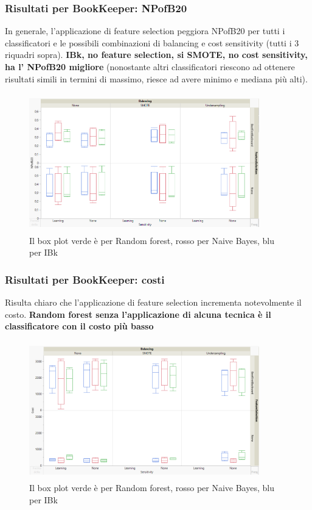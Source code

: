 \documentclass{beamer}
\begin{document}
\begin{frame}
	\frametitle{Risultati per BookKeeper: NPofB20}
	
	\fontsize{7pt}{8pt}\selectfont
	
	In generale, l'applicazione di feature selection peggiora NPofB20 per tutti i
	classificatori e le possibili combinazioni di balancing e cost sensitivity
	(tutti i 3 riquadri sopra).
	\textbf{IBk, no feature selection, si SMOTE, no cost sensitivity, ha l'
	NPofB20 migliore} (nonostante altri classificatori riescono ad ottenere risultati
	simili in termini di massimo, riesce ad avere minimo e mediana più alti).
	
	\centering
	\begin{figure}
	\includegraphics[width=10cm, height=6cm]{bookkeeper-npofb20}
	\caption{Il box plot verde è per Random forest, rosso per Naive Bayes, blu per IBk}
	\end{figure}
\end{frame}

\begin{frame}
	\frametitle{Risultati per BookKeeper: costi}
	
	\fontsize{7pt}{8pt}\selectfont
	
	Risulta chiaro che l'applicazione di feature selection incrementa notevolmente il costo.
	\textbf{Random forest senza l'applicazione di alcuna tecnica è il classificatore con il
	costo più basso}
	
	\centering
	\begin{figure}
	\includegraphics[width=10cm, height=6cm]{bookkeeper-cost}
	\caption{Il box plot verde è per Random forest, rosso per Naive Bayes, blu per IBk}
	\end{figure}
\end{frame}
\end{document}
